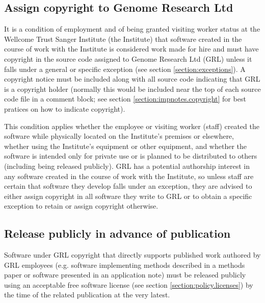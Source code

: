 \documentclass[10pt,a4paper]{article}
\begin{document}
\subsection{Assign copyright to Genome Research Ltd}
\label{section:policy.copyright}
\par It is a condition of employment and of being granted visiting worker status 
at the Wellcome Trust Sanger Institute (the Institute) that software created in the 
course of work with the Institute is considered work made for hire and must have 
copyright in the source code assigned to Genome Research Ltd (GRL) unless it 
falls under a general or specific exception (see section \ref{section:exceptions}). 
A copyright notice must be included along with all source code indicating that 
GRL is a copyright holder (normally this would be included near the top of each 
source code file in a comment block; see section \ref{section:impnotes.copyright} 
for best pratices on how to indicate copyright). 

\par This condition applies whether the employee or visiting worker (staff) 
created the software while physically located on the Institute's premises or 
elsewhere, whether using the Institute's equipment or other equipment, and 
whether the software is intended only for private use or is planned to be 
distributed to others (including being released publicly). GRL has a potential 
authorship interest in any software created in the course of work with the 
Institute, so unless staff are certain that software they develop falls 
under an exception, they are advised to either assign copyright in all software 
they write to GRL or to obtain a specific exception to retain or assign copyright 
otherwise.


\subsection{Release publicly in advance of publication}

\par Software under GRL copyright that directly supports published work authored 
by GRL employees (e.g. software implementing methods described in a methods 
paper or software presented in an application note) must be released publicly 
using an acceptable free software license (see section \ref{section:policy.licenses}) 
by the time of the related publication at the very latest. 
\end{document}
